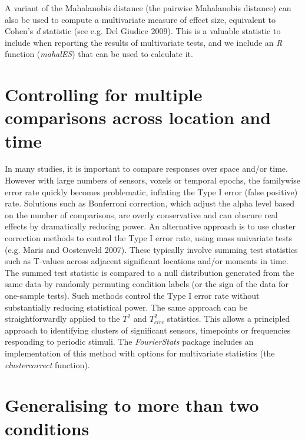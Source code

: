 \documentclass[]{article}
\begin{document}
A variant of the Mahalanobis distance (the pairwise Mahalanobis distance) can also be used to compute a multivariate measure of effect size, equivalent to Cohen's \emph{d} statistic (see e.g. Del Giudice 2009). This is a valuable statistic to include when reporting the results of multivariate tests, and we include an \emph{R} function (\emph{mahalES}) that can be used to calculate it.

\hypertarget{controlling-for-multiple-comparisons-across-location-and-time}{%
\section{Controlling for multiple comparisons across location and time}\label{controlling-for-multiple-comparisons-across-location-and-time}}

In many studies, it is important to compare responses over space and/or time. However with large numbers of sensors, voxels or temporal epochs, the familywise error rate quickly becomes problematic, inflating the Type I error (false positive) rate. Solutions such as Bonferroni correction, which adjust the alpha level based on the number of comparisons, are overly conservative and can obscure real effects by dramatically reducing power. An alternative approach is to use cluster correction methods to control the Type I error rate, using mass univariate tests (e.g. Maris and Oostenveld 2007). These typically involve summing test statistics such as T-values across adjacent significant locations and/or moments in time. The summed test statistic is compared to a null distribution generated from the same data by randomly permuting condition labels (or the sign of the data for one-sample tests). Such methods control the Type I error rate without substantially reducing statistical power. The same approach can be straightforwardly applied to the \(T^2\) and \(T^2_{circ}\) statistics. This allows a principled approach to identifying clusters of significant sensors, timepoints or frequencies responding to periodic stimuli. The \emph{FourierStats} package includes an implementation of this method with options for multivariate statistics (the \emph{clustercorrect} function).

\hypertarget{generalising-to-more-than-two-conditions}{%
\section{Generalising to more than two conditions}\label{generalising-to-more-than-two-conditions}}
\end{document}
